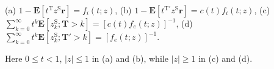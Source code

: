 (a) $1 - \mathbf{E}[t^{\mathrm{T}} z^{\mathrm{S}} \mathbf{r}] = f_i(t; z)$,
(b) $1 - \mathbf{E}[t^{\mathrm{T}'} z^{\mathrm{S}} \mathbf{r}] = c(t) f_i(t; z)$,
(c) $\sum_{k=0}^{\infty} t^k \mathbf{E}[z^{\mathrm{S}}_k; \mathbf{T} > k] = [c(t) f_e(t; z)]^{-1}$,
(d) $\sum_{k=0}^{\infty} t^k \mathbf{E}[z^{\mathrm{S}}_k; \mathbf{T}' > k] = [f_e(t; z)]^{-1}$.

Here $0 \leq t < 1$, $|z| \leq 1$ in (a) and (b), while $|z| \geq 1$ in (c) and (d).